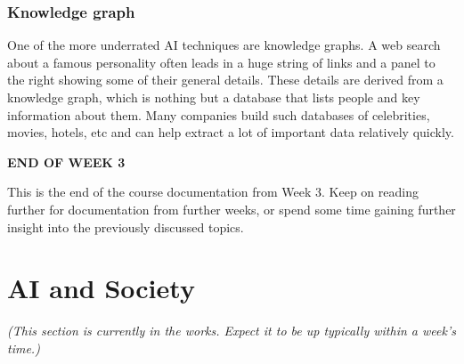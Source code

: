 \documentclass{article}[a4paper,12pt]
\theoremstyle{definition}
\begin{document}
\subsubsection{Knowledge graph}
One of the more underrated AI techniques are knowledge graphs. A web search about a famous personality often leads in a huge string of links and a panel to the right showing some of their general details. These details are derived from a knowledge graph, which is nothing but a database that lists people and key information about them. Many companies build such databases of celebrities, movies, hotels, etc and can help extract a lot of important data relatively quickly.

\hrulefill
\begin{center}
\textbf{END OF WEEK 3}
\end{center}
This is the end of the course documentation from Week 3. Keep on reading further for documentation from further weeks, or spend some time gaining further insight into the previously discussed topics.

\hrulefill
\pagebreak
\section{AI and Society}
\textit{(This section is currently in the works. Expect it to be up typically within a week's time.)}

\hrulefill
\end{document}
